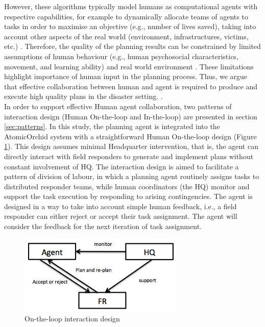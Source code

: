 However, these algorithms typically model humans as computational agents with respective capabilities, for example to dynamically allocate teams of agents to tasks in order to maximise an objective (e.g., number of lives saved), taking into account other aspects of the real world (environment, infrastructures, victims, etc.) \cite{Ramchurn2010a}. Therefore, the quality of the planning results can be constrained by limited assumptions of human behaviour (e.g., human psychosocial characteristics, movement, and learning ability) and real world environment \cite{Armenakis2012}. These limitations highlight importance of human input in the planning process. Thus, we argue that effective collaboration between human and agent is required to produce and execute high quality plans in the disaster setting. . \\

In order to support effective Human agent collaboration, two patterns of interaction design (Human On-the-loop and In-the-loop) are presented in section \ref{sec:patterns}. In this study, the planning agent is integrated into the AtomicOrchid system with a straightforward Human On-the-loop design (Figure \ref{fig:study2OnTheLoop}). This design assumes minimal Headquarter intervention, that is, the agent can directly interact with field responders to generate and implement plans without constant involvement of HQ. The interaction design is aimed to facilitate a pattern of division of labour, in which a planning agent routinely assigns tasks to distributed responder teams, while human coordinators (the HQ) monitor and support the task execution by responding to arising contingencies. The agent is designed in a way to take into account simple human feedback, i.e., a field responder can either reject or accept their task assignment. The agent will consider the feedback for the next iteration of task assignment.\\

\begin{figure}[h]
  \centering
  \includegraphics[width=0.7\textwidth]{img/approach/OnTheLoop}
  \caption{On-the-loop interaction design}
  \label{fig:study2OnTheLoop}
\end{figure}

